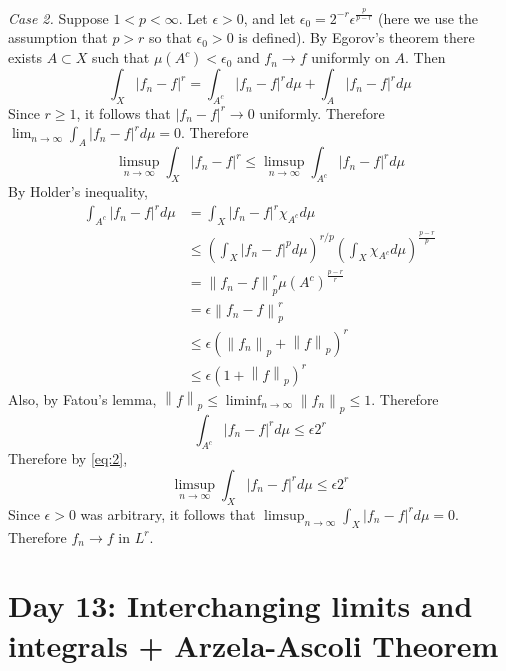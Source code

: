 \documentclass[answers]{exam}
\theoremstyle{problemstyle}
\newcommand{\norm}[1]{\left\lVert#1\right\rVert} %
\newcommand{\1}[1]{\textbf{1}_{\left[#1\right]}} %
\begin{document}
\begin{questions}
\begin{solution}
  \textit{Case 2.} Suppose $1<p<\infty$. Let $\epsilon>0$, and let $\epsilon_{0} = 2^{-r} \epsilon^{\frac{p}{p-r}}$ (here we use the assumption that $p>r$ so that $\epsilon_{0}>0$ is defined). By Egorov's theorem there exists $A\subset X$ such that $\mu(A^{c})<\epsilon_{0}$ and $f_{n}\to f$ uniformly on $A$. Then
  \begin{equation*}
    \int_{X} |f_{n}-f|^{r} = \int_{A^{c}}|f_{n}-f|^{r}d\mu + \int_{A}|f_{n}-f|^{r}d\mu
  \end{equation*}
  Since $r\geq 1$, it follows that $|f_{n}-f|^{r}\to 0$ uniformly. Therefore $\lim_{n\to\infty }\int_{A}|f_{n}-f|^{r}d\mu =0$. Therefore
  \begin{equation}\label{eq:2}
    \limsup_{n\to\infty} \int_{X} |f_{n}-f|^{r} \leq \limsup_{n\to\infty} \int_{A^{c}}|f_{n}-f|^{r}d\mu
  \end{equation}
  By Holder's inequality,
  \begin{align*}
    \int_{A^{c}}|f_{n}-f|^{r}d\mu
    &= \int_{X} |f_{n}-f|^{r}\chi_{A^{c}} d\mu\\
    &\leq \left( \int_{X}|f_{n}-f|^{p} d\mu\right)^{r/p}\left( \int_{X}\chi_{A^{c}}d\mu  \right)^{\frac{p-r}{p}}\\
    &= \norm{f_{n}-f}_{p}^{r}\mu(A^{c})^{\frac{p-r}{r}}\\
    &= \epsilon\norm{f_{n}-f}_{p}^{r}\\
    &\leq \epsilon ( \norm{f_{n}}_{p}+ \norm{f}_{p})^{r}\\
    &\leq \epsilon \left( 1 + \norm{f}_{p} \right)^{r}
  \end{align*}
  Also, by Fatou's lemma, $\norm{f}_{p}\leq \liminf_{n\to\infty} \norm{f_{n}}_{p}\leq 1$. Therefore
  \begin{equation*}
    \int_{A^{c}} | f_{n}-f|^{r}d\mu \leq \epsilon 2^{r}
  \end{equation*}
  Therefore by \eqref{eq:2},
  \begin{equation*}
     \limsup_{n\to\infty} \int_{X} |f_{n}-f|^{r}d\mu  \leq \epsilon 2^{r}
   \end{equation*}
   Since $\epsilon>0$ was arbitrary, it follows that $\limsup_{n\to\infty} \int_{X} |f_{n}-f|^{r}d\mu=0$. Therefore $f_{n}\to f$ in $L^{r}$.
\end{solution}




\newpage
\section{Day 13: Interchanging limits and integrals + Arzela-Ascoli Theorem}


\end{questions}
\end{document}

